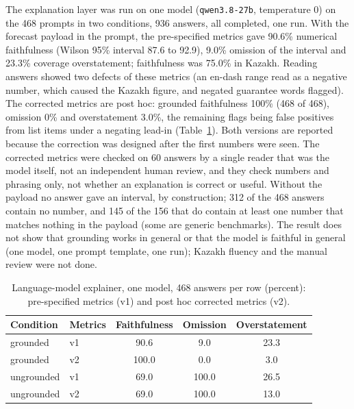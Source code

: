 The explanation layer was run on one model (\texttt{qwen3.8-27b}, temperature 0) on the 468 prompts in two conditions, 936 answers, all completed, one run. With the forecast payload in the prompt, the pre-specified metrics gave 90.6\% numerical faithfulness (Wilson 95\% interval 87.6 to 92.9), 9.0\% omission of the interval and 23.3\% coverage overstatement; faithfulness was 75.0\% in Kazakh. Reading answers showed two defects of these metrics (an en-dash range read as a negative number, which caused the Kazakh figure, and negated guarantee words flagged). The corrected metrics are post hoc: grounded faithfulness 100\% (468 of 468), omission 0\% and overstatement 3.0\%, the remaining flags being false positives from list items under a negating lead-in (Table~\ref{tab:explainer}). Both versions are reported because the correction was designed after the first numbers were seen. The corrected metrics were checked on 60 answers by a single reader that was the model itself, not an independent human review, and they check numbers and phrasing only, not whether an explanation is correct or useful. Without the payload no answer gave an interval, by construction; 312 of the 468 answers contain no number, and 145 of the 156 that do contain at least one number that matches nothing in the payload (some are generic benchmarks). The result does not show that grounding works in general or that the model is faithful in general (one model, one prompt template, one run); Kazakh fluency and the manual review were not done.

\begin{table}[t]
\centering
\caption{Language-model explainer, one model, 468 answers per row (percent): pre-specified metrics (v1) and post hoc corrected metrics (v2).}
\label{tab:explainer}
\small
\begin{tabular}{@{}llccc@{}}
\toprule
Condition & Metrics & Faithfulness & Omission & Overstatement \\
\midrule
grounded & v1 & 90.6 & 9.0 & 23.3 \\
grounded & v2 & 100.0 & 0.0 & 3.0 \\
ungrounded & v1 & 69.0 & 100.0 & 26.5 \\
ungrounded & v2 & 69.0 & 100.0 & 13.0 \\
\bottomrule
\end{tabular}
\end{table}

